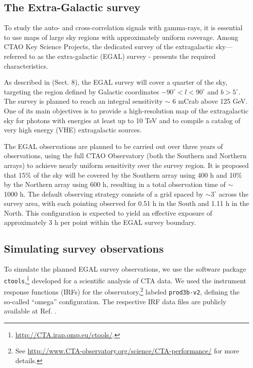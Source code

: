 \subsection{The Extra-Galactic survey}

To study the auto- and cross-correlation signals with gamma-rays, {it is essential to use maps of large sky regions with approximately uniform coverage}. Among CTAO Key Science Projects, the dedicated survey of the extragalactic sky---referred to as the extra-galactic (EGAL) survey - presents the required characteristics.

As described in \cite{CTAConsortium:2018tzg} (Sect. 8), the EGAL survey will cover a quarter of the sky, targeting the region defined by Galactic coordinates $-90^\circ < l < 90^\circ$ and $b > 5^\circ$. The survey is planned to reach an integral sensitivity $\sim$ 6 mCrab above 125 GeV. One of its main objectives is to provide a high-resolution map of the extragalactic sky for photons with energies at least up to 10 TeV and to compile a catalog of very high energy (VHE) extragalactic sources.

The EGAL observations are planned to be carried out over three years of observations, using the full CTAO Observatory (both the Southern and Northern arrays) to achieve nearly uniform sensitivity over the survey region. It is proposed that 15\% of the sky will be covered by the Southern array using 400 h and 10\% by the Northern array using 600 h, resulting in a total observation time of $\sim$ 1000 h. The default {observing strategy consists of a grid spaced by $\sim 3^\circ$ across the survey area, with each pointing observed for 0.51 h in the South and 1.11 h in the North. This configuration is expected to yield an effective exposure of approximately 3 h per point within the EGAL survey boundary.} 

\subsection{Simulating survey observations}
To simulate the planned EGAL survey observations, we use the software package {\tt ctools},\footnote{\url{http://CTA.irap.omp.eu/ctools/}.} developed for a scientific analysis of CTA data. 
We used the instrument response functions (IRFs) for the observatory,\footnote{See \url{http://www.CTA-observatory.org/science/CTA-performance/} for more details.} labeled {\tt prod3b-v2}, defining the so-called ``omega'' configuration. The respective IRF data files are publicly available at Ref. \cite{zenodo}.

